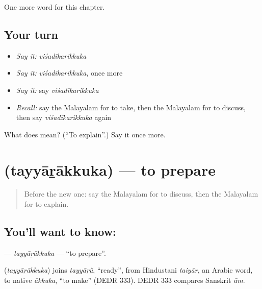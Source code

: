 \begin{grammarlens}[title={What you've built}]
One more word for this chapter.
\end{grammarlens}

\subsection*{Your turn}
\begin{itemize}
\raggedright
  \item \emph{Say it:} \emph{viśadīkarikkuka}
  \item \emph{Say it:} \emph{viśadīkarikkuka}, once more
  \item \emph{Say it:} say \emph{viśadīkarikkuka}
  \item \emph{Recall:} say the Malayalam for to take, then the Malayalam for to discuss, then say \emph{viśadīkarikkuka} again
\end{itemize}

\begin{tcolorbox}[breakable,colback=teal!4,colframe=teal!35!black,title={Before you move on}]
What does  mean? (\textquotedblleft{}To explain\textquotedblright{}.) Say it once more.
\end{tcolorbox}
\section[\texorpdfstring{\ml{തയ്യാറാക്കുക} (tayyāṟākkuka)}{തയ്യാറാക്കുക (tayyāṟākkuka)}]{ (tayyāṟākkuka) — to prepare}

\label{lesson:ML-C226-tayyarakkuka}



\begin{quote}
Before the new one: say the Malayalam for to discuss, then the Malayalam for to explain.
\end{quote}

\subsection*{You'll want to know: }
\textbf{} — \emph{tayyāṟākkuka} — \textquotedblleft{}to prepare\textquotedblright{}.

\begin{cousinweb}
\textbf{} (\emph{tayyāṟākkuka}) joins \emph{tayyāṟŭ}, \textquotedblleft{}ready\textquotedblright{}, from Hindustani \emph{taiyār}, an Arabic word, to native \emph{ākkuka}, \textquotedblleft{}to make\textquotedblright{} (DEDR 333). DEDR 333 compares Sanskrit \emph{ām}.
\end{cousinweb}

